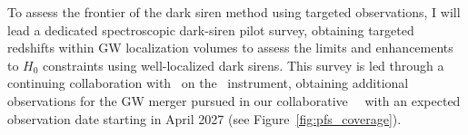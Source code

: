 To assess the frontier of the dark siren method using targeted observations, I will lead a dedicated spectroscopic dark-siren pilot survey, obtaining targeted redshifts within GW localization volumes to assess the limits and enhancements to $H_0$ constraints using well-localized dark sirens. This survey is led through a continuing collaboration with \JGEM\ on the \PFS\ instrument, obtaining additional observations for the GW merger pursued in our collaborative \DESGW\ \ToO\, with an expected observation date starting in April 2027 (see Figure~\ref{fig:pfs_coverage}).



